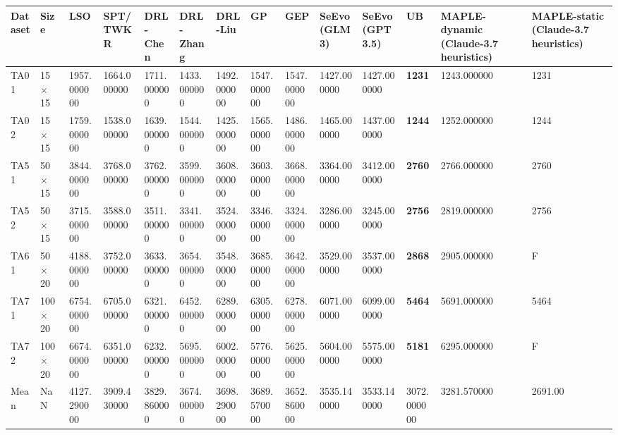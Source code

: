 \begin{tabular}{ll}
\toprule
Dataset & Size & LSO & SPT/TWKR & DRL-Chen & DRL-Zhang & DRL-Liu & GP & GEP & SeEvo(GLM3) & SeEvo(GPT3.5) & UB & MAPLE-dynamic (Claude-3.7 heuristics) & MAPLE-static (Claude-3.7 heuristics) \\
\midrule
TA01 & 15 × 15 & 1957.000000 & 1664.000000 & 1711.000000 & 1433.000000 & 1492.000000 & 1547.000000 & 1547.000000 & 1427.000000 & 1427.000000 & \textbf{1231} & 1243.000000 & 1231 \\
TA02 & 15 × 15 & 1759.000000 & 1538.000000 & 1639.000000 & 1544.000000 & 1425.000000 & 1565.000000 & 1486.000000 & 1465.000000 & 1437.000000 & \textbf{1244} & 1252.000000 & 1244 \\
TA51 & 50 × 15 & 3844.000000 & 3768.000000 & 3762.000000 & 3599.000000 & 3608.000000 & 3603.000000 & 3668.000000 & 3364.000000 & 3412.000000 & \textbf{2760} & 2766.000000 & 2760 \\
TA52 & 50 × 15 & 3715.000000 & 3588.000000 & 3511.000000 & 3341.000000 & 3524.000000 & 3346.000000 & 3324.000000 & 3286.000000 & 3245.000000 & \textbf{2756} & 2819.000000 & 2756 \\
TA61 & 50 × 20 & 4188.000000 & 3752.000000 & 3633.000000 & 3654.000000 & 3548.000000 & 3685.000000 & 3642.000000 & 3529.000000 & 3537.000000 & \textbf{2868} & 2905.000000 & F \\
TA71 & 100 × 20 & 6754.000000 & 6705.000000 & 6321.000000 & 6452.000000 & 6289.000000 & 6305.000000 & 6278.000000 & 6071.000000 & 6099.000000 & \textbf{5464} & 5691.000000 & 5464 \\
TA72 & 100 × 20 & 6674.000000 & 6351.000000 & 6232.000000 & 5695.000000 & 6002.000000 & 5776.000000 & 5625.000000 & 5604.000000 & 5575.000000 & \textbf{5181} & 6295.000000 & F \\
Mean & NaN & 4127.290000 & 3909.430000 & 3829.860000 & 3674.000000 & 3698.290000 & 3689.570000 & 3652.860000 & 3535.140000 & 3533.140000 & 3072.000000 & 3281.570000 & 2691.00 \\
\bottomrule
\end{tabular}
